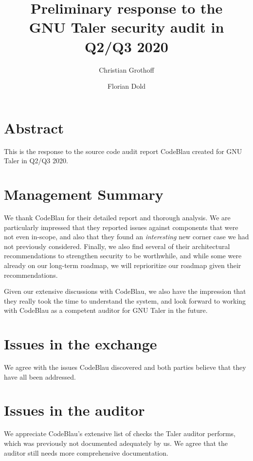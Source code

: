 \documentclass[11pt]{article}
\begin{document}
\pagestyle{headings}
\title{Preliminary response to the \\ GNU Taler security audit in Q2/Q3 2020}
\author{Christian Grothoff \and Florian Dold}

\maketitle

\section{Abstract}

This is the response to the source code audit report CodeBlau
created for GNU Taler in Q2/Q3 2020. 

\section{Management Summary}

We thank CodeBlau for their detailed report and thorough analysis. We are
particularly impressed that they reported issues against components that were
not even in-scope, and also that they found an {\em interesting} new corner
case we had not previously considered. Finally, we also find several of their
architectural recommendations to strengthen security to be worthwhile, and
while some were already on our long-term roadmap, we will reprioritize our
roadmap given their recommendations.

Given our extensive discussions with CodeBlau, we also have the impression
that they really took the time to understand the system, and look forward
to working with CodeBlau as a competent auditor for GNU Taler in the future.

\section{Issues in the exchange}

We agree with the issues CodeBlau discovered and both parties believe that
they have all been addressed.

\section{Issues in the auditor}

We appreciate CodeBlau's extensive list of checks the Taler auditor performs,
which was previously not documented adequately by us. We agree that the
auditor still needs more comprehensive documentation.
\end{document}
